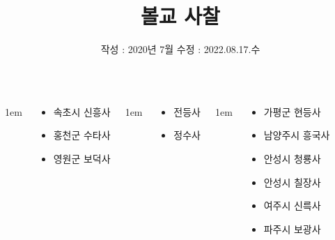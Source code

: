 \documentclass[	20pt, 
							a0paper, 
							landscape,
							margin=0mm, %
							innermargin=10mm,  		%
							blockverticalspace=4mm, %
							colspace=5mm, 
							subcolspace=0mm
							]{tikzposter}
\title{ 볼교 사찰 }
\author{ 	작성 : 2020년 7월  수정 : 2022.08.17.수 }
\begin{document}
	\maketitle[
					width=841mm,
					linewidth = 2mm,
					innersep=4mm,
					titletotopverticalspace=2mm, %
					titletoblockverticalspace=2mm, %
					titletextscale =4, 
				]


	\begin{columns}


			{
					\setlength{\leftmargini}{4em}
					\setlength{\labelsep} {1em}
				\begin{LARGE}
					\begin{itemize}
					\item 속초시 신흥사
					\item 홍천군 수타사
					\item 영원군 보덕사
					\end{itemize}
				\end{LARGE}
			} %

			{
					\setlength{\leftmargini}{4em}
					\setlength{\labelsep} {1em}
				\begin{LARGE}
					\begin{itemize}
					\item 전등사
					\item 정수사
					\end{itemize}
				\end{LARGE}
			} %


			{
					\setlength{\leftmargini}{4em}
					\setlength{\labelsep} {1em}
				\begin{LARGE}
					\begin{itemize}
					\item 가평군 현등사
					\item 남양주시 흥국사
					\item 안성시 청룡사

					\item 안성시 칠장사
					\item 여주시 신륵사
					\item 파주시 보광사


\end{itemize}
\end{LARGE}}
\end{columns}
\end{document}
